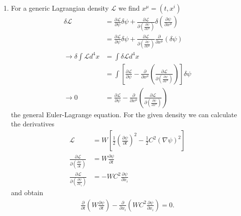 \documentclass[../main.tex]{subfiles}
\begin{document}
\begin{enumerate}[label=(\alph*)]
\item For a generic Lagrangian density $\mathcal{L}$ we find $x^\mu=(t,x^i)$
\begin{align}
    \delta\mathcal{L}
    &=\frac{\partial \mathcal{L}}{\partial\psi}\delta\psi+\frac{\partial \mathcal{L}}{\partial\left(\frac{\partial \psi}{\partial x^\mu}\right)}\delta\left(\frac{\partial \psi}{\partial x^\mu}\right)\\
    &=\frac{\partial \mathcal{L}}{\partial\psi}\delta\psi+\frac{\partial \mathcal{L}}{\partial\left(\frac{\partial \psi}{\partial x^\mu}\right)}\frac{\partial}{\partial x^\mu}\left(\delta\psi\right)\\
    \rightarrow\delta\int\mathcal{L}d^4x
    &=\int\delta\mathcal{L}d^4x\\
    &=\int\left[\frac{\partial \mathcal{L}}{\partial\psi}-\frac{\partial}{\partial x^\mu}\left(\frac{\partial \mathcal{L}}{\partial\left(\frac{\partial \psi}{\partial x^\mu}\right)}\right)\right]\delta\psi\\
    \rightarrow 0&=\frac{\partial \mathcal{L}}{\partial\psi}-\frac{\partial}{\partial x^\mu}\left(\frac{\partial \mathcal{L}}{\partial\left(\frac{\partial \psi}{\partial x^\mu}\right)}\right)
\end{align}
the general Euler-Lagrange equation. For the given density we can calculate the derivatives
\begin{align}
    \mathcal{L}&=W\left[\frac{1}{2}\left(\frac{\partial\psi}{\partial t}\right)^2-\frac{1}{2}C^2\left(\nabla\psi\right)^2\right]\\
    \frac{\partial \mathcal{L}}{\partial\left(\frac{\partial \psi}{\partial t}\right)}&=W\frac{\partial \psi}{\partial t}\\
    \frac{\partial \mathcal{L}}{\partial\left(\frac{\partial \psi}{\partial x_i}\right)}&=-WC^2\frac{\partial\psi}{\partial x_i}
\end{align}
and obtain
\begin{align}
    \frac{\partial}{\partial t}\left(W\frac{\partial\psi}{\partial t}\right)-\frac{\partial}{\partial x_i}\left(WC^2\frac{\partial \psi}{\partial x_i}\right)=0.
\end{align}


\end{enumerate}
\end{document}
